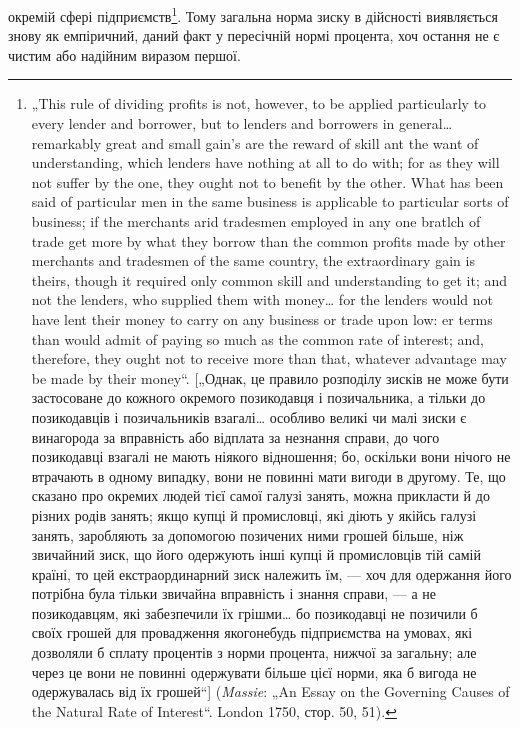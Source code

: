 \parcont{}  %
окремій сфері підприємств\footnote{
„This rule of dividing profits is not, however, to be applied particularly to
every lender and borrower, but to lenders and borrowers in general\dots{} remarkably
great and small gain's are the reward of skill ant the want of understanding, which
lenders have nothing at all to do with; for as they will not suffer by the one,
they ought not to benefit by the other. What has been said of particular men in
the same business is applicable to particular sorts of business; if the merchants
arid tradesmen employed in any one bratlch of trade get more by what they borrow
than the common profits made by other merchants and tradesmen of the same
country, the extraordinary gain is theirs, though it required only common skill
and understanding to get it; and not the lenders, who supplied them with money\dots{}
for the lenders would not have lent their money to carry on any business or trade
upon low: er terms than would admit of paying so much as the common rate of
interest; and, therefore, they ought not to receive more than that, whatever advantage
may be made by their money“. [„Однак, це правило розподілу зисків не
може бути застосоване до кожного окремого позикодавця і позичальника, а
тільки до позикодавців і позичальників взагалі\dots{} особливо великі чи малі зиски
є винагорода за вправність або відплата за незнання справи, до чого позикодавці
взагалі не мають ніякого відношення; бо, оскільки вони нічого не втрачають
в одному випадку, вони не повинні мати вигоди в другому. Те, що сказано
про окремих людей тієї самої галузі занять, можна прикласти й до різних
родів занять; якщо купці й промисловці, які діють у якійсь галузі занять, заробляють
за допомогою позичених ними грошей більше, ніж звичайний зиск,
що його одержують інші купці й промисловців тій самій країні, то цей екстраординарний
зиск належить їм, — хоч для одержання його потрібна була тільки
звичайна вправність і знання справи, — а не позикодавцям, які забезпечили
їх грішми\dots{} бо позикодавці не позичили б своїх грошей для провадження якогонебудь
підприємства на умовах, які дозволяли б сплату процентів з норми
процента, нижчої за загальну; але через це вони не повинні одержувати більше
цієї норми, яка б вигода не одержувалась від їх грошей“] (\emph{Massie}: „An
Essay on the Governing Causes of the Natural Rate of Interest“. London 1750,
стор. 50, 51).
}. Тому загальна норма зиску в дійсності
виявляється знову як емпіричний, даний факт у пересічній
нормі процента, хоч остання не є чистим або надійним виразом
першої.


